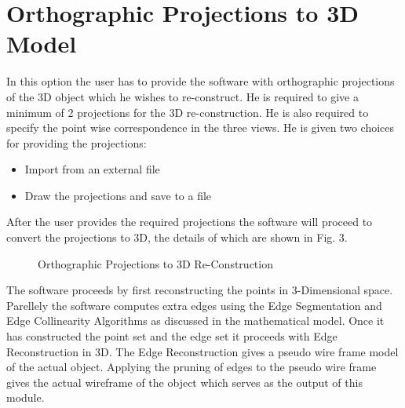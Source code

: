 \documentclass[a4paper,12pt,openany]{report}
\begin{document}
\chapter*{Orthographic Projections to 3D Model}
In this option the user has to provide the software with orthographic projections of the 3D object which he wishes to re-construct. He is required to give a minimum of 2 projections for the 3D re-construction. He is also required to specify the point wise correspondence in the three views. He is given two choices for providing the projections:
\begin{itemize}
  \item Import from an external file
  \item Draw the projections and save to a file
\end{itemize}

After the user provides the required projections the software will proceed to convert the projections to 3D, the details of which are shown in Fig. 3.
\begin{figure}[h]
	\centering
	\caption{Orthographic Projections to 3D Re-Construction}
\end{figure}

The software proceeds by first reconstructing the points in 3-Dimensional space. Parellely the software computes extra edges using the Edge Segmentation and Edge Collinearity Algorithms as discussed in the mathematical model. Once it has constructed the point set and the edge set it proceeds with Edge Reconstruction in 3D. The Edge Reconstruction gives a pseudo wire frame model of the actual object. Applying the pruning of edges to the pseudo wire frame gives the actual wireframe of the object which serves as the output of this module.
\end{document}
